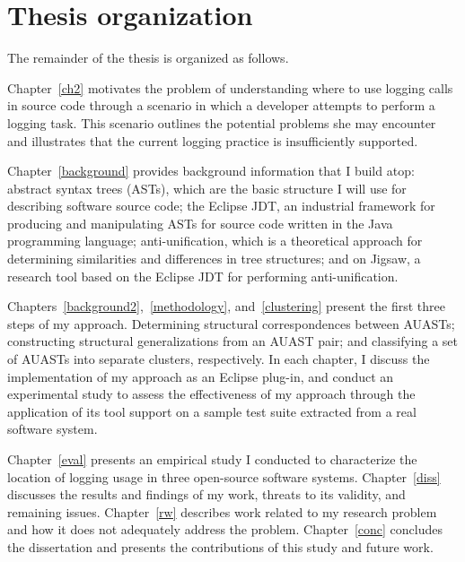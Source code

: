 \section{Thesis organization} \label{intro-org}
The remainder of the thesis is organized as follows.

Chapter~\ref{ch2} motivates the problem of understanding where to use logging calls in source code through a scenario in which a developer attempts to perform a logging task. This scenario outlines the potential problems she may encounter and illustrates that the current logging practice is insufficiently supported.

Chapter~\ref{background} provides background information that I build atop: abstract syntax trees (ASTs), which are the basic structure I will use for describing software source code; the Eclipse JDT, an industrial framework for producing and manipulating ASTs for source code written in the Java programming language; anti-unification, which is a theoretical approach for determining similarities and differences in tree structures; and on Jigsaw, a research tool based on the Eclipse JDT for performing anti-unification.

Chapters~\ref{background2},~\ref{methodology}, and~\ref{clustering} present the first three steps of my approach. Determining structural correspondences between AUASTs; constructing structural generalizations from an AUAST pair; and classifying a set of AUASTs into separate clusters, respectively. In each chapter, I discuss the implementation of my approach as an Eclipse plug-in, and conduct an experimental study to assess the effectiveness of my approach through the application of its tool support on a sample test suite extracted from a real software system.



Chapter~\ref{eval} presents an empirical study I conducted to characterize the location of logging usage in three open-source software systems. Chapter~\ref{diss} discusses the results and findings of my work, threats to its validity, and remaining issues. Chapter~\ref{rw} describes work related to my research problem and how it does not adequately address the problem. Chapter~\ref{conc} concludes the dissertation and presents the contributions of this study and future work. %




